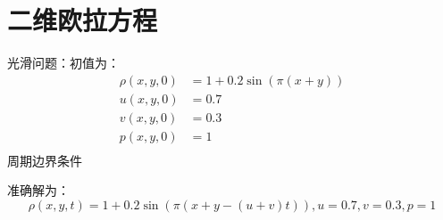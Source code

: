 \documentclass{book}
\begin{document}
\section{二维欧拉方程}
\begin{example}[二维欧拉方程光滑算例]{}{}
    光滑问题：初值为：
    \begin{equation}
        \begin{aligned}
            \rho(x,y,0) & = 1+0.2\sin(\pi(x+y)) \\
            u(x,y,0)    & = 0.7                 \\
            v(x,y,0)    & = 0.3                 \\
            p(x,y,0)    & = 1                   \\
        \end{aligned}
    \end{equation}
    周期边界条件

    准确解为：
    \begin{equation}
        \rho(x,y,t) = 1+0.2\sin(\pi(x+y-(u+v)t)),u=0.7,v=0.3,p=1
    \end{equation}
\end{example}
\end{document}
